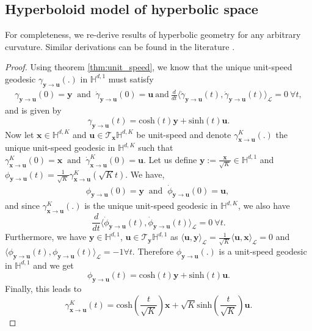 \documentclass{article}
\begin{document}
\subsection{Hyperboloid model of hyperbolic space}
For completeness, we re-derive results of hyperbolic geometry for any arbitrary curvature. 
Similar derivations can be found in the literature \cite{wilson2014spherical}.
\geodesics*
\begin{proof}
Using theorem \ref{thm:unit_speed}, we know that the unique unit-speed geodesic $\gamma_{\mathbf{y}\rightarrow\mathbf{u}}(.)$ in $\mathbb{H}^{d,1}$ must satisfy
\begin{align*}
    \gamma_{\mathbf{y}\rightarrow\mathbf{u}}(0)=\mathbf{y} \ \text{ and }\ \dot{\gamma}_{\mathbf{y}\rightarrow\mathbf{u}}(0)=\mathbf{u} \ \text{and}\ 
    \frac{d}{dt}\langle\dot{\gamma}_{\mathbf{y}\rightarrow\mathbf{u}}(t),\dot{\gamma}_{\mathbf{y}\rightarrow\mathbf{u}}(t)\rangle_\mathcal{L}=0 \ \forall t,
\end{align*}
and is given by
$$\gamma_{\mathbf{y}\rightarrow\mathbf{u}}(t)=\mathrm{cosh}(t)\mathbf{y}+\mathrm{sinh}(t)\mathbf{u}.$$
Now let $\mathbf{x}\in\mathbb{H}^{d,K}$ and $\mathbf{u}\in\mathcal{T}_\mathbf{x}\mathbb{H}^{d,K}$ be unit-speed
and denote $\gamma^K_{\mathbf{x}\rightarrow\mathbf{u}}(.)$ the unique unit-speed geodesic in $\mathbb{H}^{d,K}$ such that 
$\gamma^K_{\mathbf{x}\rightarrow\mathbf{u}}(0)=\mathbf{x} \ \text{ and }\ \dot{\gamma}^K_{\mathbf{x}\rightarrow\mathbf{u}}(0)=\mathbf{u}$. 
Let us define $\mathbf{y}:=\frac{\mathbf{x}}{\sqrt{K}}\in\mathbb{H}^{d,1}$ and $\phi_{\mathbf{y}\rightarrow\mathbf{u}}(t)=\frac{1}{\sqrt{K}}\gamma^K_{\mathbf{x}\rightarrow\mathbf{u}}(\sqrt{K}t)$. We have,
\begin{align*}
\phi_{\mathbf{y}\rightarrow\mathbf{u}}(0)=\mathbf{y} \ \text{ and }\ \dot{\phi}_{\mathbf{y}\rightarrow\mathbf{u}}(0)=\mathbf{u}, \
\end{align*}
and since $\gamma^K_{\mathbf{x}\rightarrow\mathbf{u}}(.)$ is the unique unit-speed geodesic in $\mathbb{H}^{d,K}$, we also have
$$\frac{d}{dt}\langle\dot{\phi}_{\mathbf{y}\rightarrow\mathbf{u}}(t),\dot{\phi}_{\mathbf{y}\rightarrow\mathbf{u}}(t)\rangle_\mathcal{L}=0 \ \forall t.$$
Furthermore, we have $\mathbf{y}\in\mathbb{H}^{d,1}$, $\mathbf{u}\in\mathcal{T}_{\mathbf{y}}\mathbb{H}^{d,1}$ as $\langle\mathbf{u},\mathbf{y}\rangle_\mathcal{L}=\frac{1}{\sqrt{K}}\langle\mathbf{u},\mathbf{x}\rangle_\mathcal{L}=0$ and $\langle\phi_{\mathbf{y}\rightarrow\mathbf{u}}(t),\phi_{\mathbf{y}\rightarrow\mathbf{u}}(t)\rangle_\mathcal{L}=-1\forall t$.
Therefore $\phi_{\mathbf{y}\rightarrow\mathbf{u}}(.)$ is a unit-speed geodesic in $\mathbb{H}^{d,1}$ and we get
$$\phi_{\mathbf{y}\rightarrow\mathbf{u}}(t)=\mathrm{cosh}(t)\mathbf{y}+\mathrm{sinh}(t)\mathbf{u}.$$
Finally, this leads to 
$$\gamma^K_{\mathbf{x}\rightarrow\mathbf{u}}(t)=\mathrm{cosh}(\frac{t}{\sqrt{K}})\mathbf{x}+\sqrt{K}\mathrm{sinh}(\frac{t}{\sqrt{K}})\mathbf{u}.$$


\end{proof}
\end{document}
